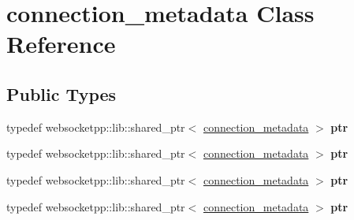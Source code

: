 \hypertarget{classconnection__metadata}{}\section{connection\+\_\+metadata Class Reference}
\label{classconnection__metadata}
\subsection*{Public Types}
\begin{DoxyCompactItemize}
\item 
typedef websocketpp\+::lib\+::shared\+\_\+ptr$<$ \hyperlink{classconnection__metadata}{connection\+\_\+metadata} $>$ {\bfseries ptr}\hypertarget{classconnection__metadata_addf7404d76d8f9754aa128a85dc9a757}{}\label{classconnection__metadata_addf7404d76d8f9754aa128a85dc9a757}

\item 
typedef websocketpp\+::lib\+::shared\+\_\+ptr$<$ \hyperlink{classconnection__metadata}{connection\+\_\+metadata} $>$ {\bfseries ptr}\hypertarget{classconnection__metadata_addf7404d76d8f9754aa128a85dc9a757}{}\label{classconnection__metadata_addf7404d76d8f9754aa128a85dc9a757}

\item 
typedef websocketpp\+::lib\+::shared\+\_\+ptr$<$ \hyperlink{classconnection__metadata}{connection\+\_\+metadata} $>$ {\bfseries ptr}\hypertarget{classconnection__metadata_addf7404d76d8f9754aa128a85dc9a757}{}\label{classconnection__metadata_addf7404d76d8f9754aa128a85dc9a757}

\item 
typedef websocketpp\+::lib\+::shared\+\_\+ptr$<$ \hyperlink{classconnection__metadata}{connection\+\_\+metadata} $>$ {\bfseries ptr}\hypertarget{classconnection__metadata_addf7404d76d8f9754aa128a85dc9a757}{}\label{classconnection__metadata_addf7404d76d8f9754aa128a85dc9a757}

\end{DoxyCompactItemize}

